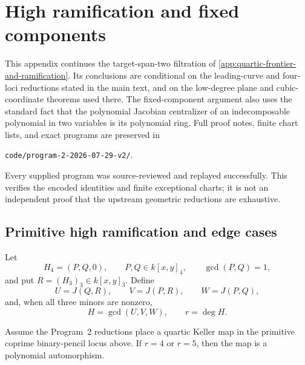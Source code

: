\section{High ramification and fixed components}
\label{app:quartic-high-ramification-fixed-components}

This appendix continues the target-span-two filtration of
\cref{app:quartic-frontier-and-ramification}.  Its conclusions are
conditional on the leading-curve and four-loci reductions stated in the
main text, and on the low-degree plane and cubic-coordinate theorems used
there.  The fixed-component argument also uses the standard fact that the
polynomial Jacobian centralizer of an indecomposable polynomial in two
variables is its polynomial ring.  Full proof notes, finite chart lists,
and exact programs are preserved in
\begin{center}
\texttt{code/program-2-2026-07-29-v2/}.
\end{center}
Every supplied program was source-reviewed and replayed successfully.  This
verifies the encoded identities and finite exceptional charts; it is not an
independent proof that the upstream geometric reductions are exhaustive.

\subsection{Primitive high ramification and edge cases}

Let
\[
 H_4=(P,Q,0),\qquad P,Q\in k[x,y]_4,\qquad \gcd(P,Q)=1,
\]
and put \(R=(H_3)_3\in k[x,y]_3\).  Define
\[
 U=J(Q,R),\qquad V=J(P,R),\qquad W=J(P,Q),
\]
and, when all three minors are nonzero,
\[
 H=\gcd(U,V,W),\qquad r=\deg H.
\]

\begin{theorem}
\label{thm:quartic-high-ramification}
Assume the Program~2 reductions place a quartic Keller map in the
primitive coprime binary-pencil locus above.  If \(r=4\) or \(r=5\), then
the map is a polynomial automorphism.
\end{theorem}

